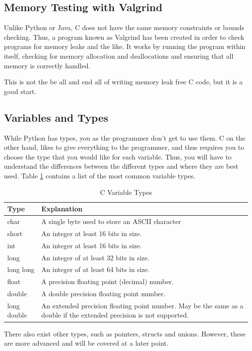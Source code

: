 \documentclass[a4paper,11pt]{report}
\begin{document}
		\subsection{Memory Testing with Valgrind}
			Unlike Python or Java, C does not have the same memory constraints or bounds checking. 
			Thus, a program known as Valgrind has been created in order to check programs for memory leaks and the like. 
			It works by running the program within itself, checking for memory allocation and deallocations and ensuring that all memory is correctly handled. 

			This is not the be all and end all of writing memory leak free C code, but it is a good start. 
		\subsection{Variables and Types}
			While Python has types, you as the programmer don't get to use them. 
			C on the other hand, likes to give everything to the programmer, and thus requires you to choose the type that you would like for each variable. 
			Thus, you will have to understand the differences between the different types and where they are best used. 
			Table \ref{tab:CVariableTypes} contains a list of the most common variable types. 
			\begin{table}[htb]
				\centering
				\begin{tabular}{| l | p{8cm} |}
					\hline
					\textbf{Type} & \textbf{Explanation} \\ \hline 
					char & A single byte used to store an ASCII character \\ \hline \hline
					short & An integer at least 16 bits in size. \\ \hline
					int & An integer at least 16 bits in size. \\ \hline
					long & An integer of at least 32 bits in size. \\ \hline
					long long & An integer of at least 64 bits in size. \\ \hline \hline
					float & A precision floating point (decimal) number. \\ \hline
					double & A double precision floating point number. \\ \hline
					long double & An extended precision floating point number. 
					May be the same as a double if the extended precision is not supported. \\ \hline 
				\end{tabular}
				\caption{C Variable Types}
				\label{tab:CVariableTypes}
			\end{table}
			There also exist other types, such as pointers, structs and unions. 
			However, these are more advanced and will be covered at a later point. 
\end{document}
